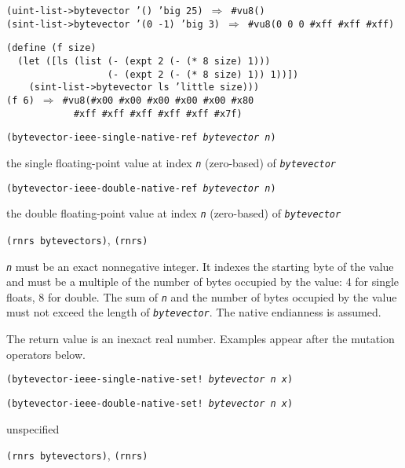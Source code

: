\begin{alltt}
(uint-list-\textgreater{}bytevector '() 'big 25) \(\Rightarrow\) \#{}vu8()
(sint-list-\textgreater{}bytevector '(0 -1) 'big 3) \(\Rightarrow\) \#{}vu8(0 0 0 \#{}xff \#{}xff \#{}xff)

(define (f size)
  (let ([ls (list (- (expt 2 (- (* 8 size) 1)))
                  (- (expt 2 (- (* 8 size) 1)) 1))])
    (sint-list-\textgreater{}bytevector ls 'little size)))
(f 6) \(\Rightarrow\) \#{}vu8(\#{}x00 \#{}x00 \#{}x00 \#{}x00 \#{}x00 \#{}x80
            \#{}xff \#{}xff \#{}xff \#{}xff \#{}xff \#{}x7f)
\end{alltt}

\begin{description}

\label{objects_s262}\item[procedure] \texttt{(bytevector-ieee-single-native-ref \textit{bytevector} \textit{n})}



\item[returns] the single floating-point value at index \texttt{\textit{n}} (zero-based) of \texttt{\textit{bytevector}} 


\item[procedure] \texttt{(bytevector-ieee-double-native-ref \textit{bytevector} \textit{n})}



\item[returns] the double floating-point value at index \texttt{\textit{n}} (zero-based) of \texttt{\textit{bytevector}} 


\item[libraries] \texttt{(rnrs bytevectors)}, \texttt{(rnrs)}
\end{description}

\texttt{\textit{n}} must be an exact nonnegative integer.
It indexes the starting byte of the value and must be a multiple of the
number of bytes occupied by the value: 4 for single floats, 8 for double.
The sum of \texttt{\textit{n}} and the number of bytes occupied by the value must
not exceed the length of \texttt{\textit{bytevector}}.
The native endianness is assumed.

The return value is an inexact real number.
Examples appear after the mutation operators below.

\begin{description}

\label{objects_s263}\item[procedure] \texttt{(bytevector-ieee-single-native-set! \textit{bytevector} \textit{n} \textit{x})}



\item[procedure] \texttt{(bytevector-ieee-double-native-set! \textit{bytevector} \textit{n} \textit{x})}



\item[returns] unspecified


\item[libraries] \texttt{(rnrs bytevectors)}, \texttt{(rnrs)}
\end{description}


